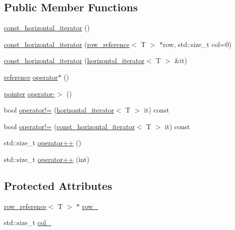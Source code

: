 \subsection*{Public Member Functions}
\begin{DoxyCompactItemize}
\item 
\hyperlink{classconst__horizontal__iterator_abbe0d839e7736f819796c32ecd68ddb8}{const\-\_\-horizontal\-\_\-iterator} ()
\item 
\hyperlink{classconst__horizontal__iterator_afc5d741260a91917634f790ba9e7d7bb}{const\-\_\-horizontal\-\_\-iterator} (\hyperlink{classrow__reference}{row\-\_\-reference}$<$ T $>$ $\ast$row, std\-::size\-\_\-t col=0)
\item 
\hyperlink{classconst__horizontal__iterator_a7e738578f8a331d227cf21e9f07e6fa3}{const\-\_\-horizontal\-\_\-iterator} (\hyperlink{classhorizontal__iterator}{horizontal\-\_\-iterator}$<$ T $>$ \&it)
\item 
\hyperlink{classconst__horizontal__iterator_aa685786b86159c42546250d5026fa205}{reference} \hyperlink{classconst__horizontal__iterator_a19c025c18a1dd8aba5ffa83fc3c799d3}{operator$\ast$} ()
\item 
\hyperlink{classconst__horizontal__iterator_a44794e7f9d7ca88a648604b53ee343e4}{pointer} \hyperlink{classconst__horizontal__iterator_a134653b64186d218eca1403a23dc93f1}{operator-\/$>$} ()
\item 
bool \hyperlink{classconst__horizontal__iterator_a5169df23e17310ec4de9795eb7d4fd67}{operator!=} (\hyperlink{classhorizontal__iterator}{horizontal\-\_\-iterator}$<$ T $>$ it) const 
\item 
bool \hyperlink{classconst__horizontal__iterator_a86a70f377a32a85a7ffbced43159848a}{operator!=} (\hyperlink{classconst__horizontal__iterator}{const\-\_\-horizontal\-\_\-iterator}$<$ T $>$ it) const 
\item 
std\-::size\-\_\-t \hyperlink{classconst__horizontal__iterator_aacdc16735e9f7b65a251c367ffbf8c0c}{operator++} ()
\item 
std\-::size\-\_\-t \hyperlink{classconst__horizontal__iterator_a4bc3f0bc48bf660cca931973b6578dc7}{operator++} (int)
\end{DoxyCompactItemize}
\subsection*{Protected Attributes}
\begin{DoxyCompactItemize}
\item 
\hyperlink{classrow__reference}{row\-\_\-reference}$<$ T $>$ $\ast$ \hyperlink{classconst__horizontal__iterator_a10b63a186970a5302dddcd56790ab9c8}{row\-\_\-}
\item 
std\-::size\-\_\-t \hyperlink{classconst__horizontal__iterator_a6974fbff9039d679083a0ad3a596d3c4}{col\-\_\-}
\end{DoxyCompactItemize}


